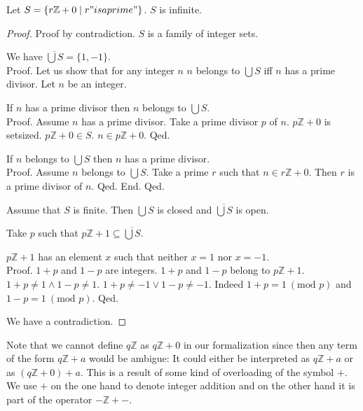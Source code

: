 \documentclass{article}
\renewcommand{\mod}{\text{mod }}
\newcommand{\Int}{\mathbb{Z}}
\begin{document}
  \begin{forthel}
    \begin{theorem}[Fuerstenberg]
      Let $S = \{ r \Int + 0 \mid r "is a prime" \}$. $S$ is infinite.
    \end{theorem}
    \begin{proof}
      Proof by contradiction. $S$ is a family of integer sets.

      We have $\overline{\bigcup S} = \{ 1, -1 \}$. \\
      Proof.
        Let us show that for any integer $n$ $n$ belongs to $\bigcup S$ iff $n$ has a prime divisor.
          Let $n$ be an integer.

          If $n$ has a prime divisor then $n$ belongs to $\bigcup S$. \\
          Proof.
            Assume $n$ has a prime divisor. Take a prime divisor $p$ of $n$. $p \Int + 0$ is setsized. $p \Int + 0 \in S$. $n \in p \Int + 0$.
          Qed.

          If $n$ belongs to $\bigcup S$ then $n$ has a prime divisor. \\
          Proof.
            Assume $n$ belongs to $\bigcup S$. Take a prime $r$ such that $n \in r \Int + 0$. Then $r$ is a prime divisor of $n$.
          Qed.
        End.
      Qed.

      Assume that $S$ is finite. Then $\bigcup S$ is closed and $\overline{\bigcup S}$ is open.

      Take $p$ such that $p \Int + 1 \subseteq \overline{\bigcup S}$.

      $p \Int + 1$ has an element $x$ such that neither $x = 1$ nor $x = -1$. \\
      Proof.
        $1 + p$ and $1 - p$ are integers.
        $1 + p$ and $1 - p$ belong to $p \Int + 1$. $1 + p \neq  1 \wedge 1 - p \neq  1$. $1 + p \neq -1 \vee 1 - p \neq -1$. Indeed $1 + p = 1 ~(\mod p)$ and $1 - p = 1 ~(\mod p)$.
      Qed.

      We have a contradiction.
    \end{proof}
  \end{forthel}

  Note that we cannot define $q \Int$ as $q \Int + 0$ in our formalization since then any term of the form $q \Int + a$ would be ambigue: It could either be interpreted as $q \Int + a$ or as $(q \Int + 0) + a$. This is a result of some kind of overloading of the symbol $+$. We use $+$ on the one hand to denote integer addition and on the other hand it is part of the operator $- \Int + -$.

  \vfill\doclicenseThis
\end{document}
